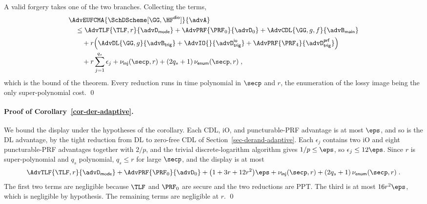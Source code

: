  A valid forgery takes one of the two branches. Collecting the terms,
$$
\begin{aligned}
&\AdvEUFCMA{\SchDScheme[\GG,\HF^{\mathsf{dio}}]}{\advA}\\
&\quad\le
\AdvTLF{\TLF,r}{\advD_{\mathsf{mode}}}
+\AdvPRF{\PRF_0}{\advD_0}
+\AdvCDL{\GG,g,f}{\advB_{\mathsf{main}}}\\
&\qquad+r\Big(
\AdvDL{\GG,g}{\advB_{\mathsf{trig}}}
+\AdvIO{}{\advD^{\mathsf{io}}_{\mathsf{trig}}}
+\AdvPRF{\PRF_4}{\advD^{\mathsf{prf}}_{\mathsf{trig}}}
\Big)\\
&\qquad+r\sum_{j=1}^{q_s}\epsilon_j
+\nu_{\mathsf{inj}}(\secp,r)
+(2q_s+1)\,\nu_{\mathsf{enum}}(\secp,r) \;,
\end{aligned}
$$
which is the bound of the theorem. Every reduction runs in time polynomial in $\secp$ and $r$, the enumeration of the lossy image being the only super-polynomial cost. \qed

\paragraph*{Proof of Corollary~\ref{cor-der-adaptive}.} We bound the display under the hypotheses of the corollary. Each CDL, iO, and puncturable-PRF advantage is at most $\eps$, and so is the DL advantage, by the tight reduction from DL to zero-free CDL of Section~\ref{sec-derand-adaptive}. Each $\epsilon_j$ contains two iO and eight puncturable-PRF advantages together with $2/p$, and the trivial discrete-logarithm algorithm gives $1/p \le \eps$, so $\epsilon_j \le 12\eps$. Since $r$ is super-polynomial and $q_s$ polynomial, $q_s \le r$ for large $\secp$, and the display is at most
$$
\AdvTLF{\TLF,r}{\advD_{\mathsf{mode}}}
+\AdvPRF{\PRF_0}{\advD_0}
+\big(1 + 3r + 12r^2\big)\eps
+\nu_{\mathsf{inj}}(\secp,r)
+(2q_s+1)\,\nu_{\mathsf{enum}}(\secp,r) \;.
$$
The first two terms are negligible because $\TLF$ and $\PRF_0$ are secure and the two reductions are PPT. The third is at most $16 r^2 \eps$, which is negligible by hypothesis. The remaining terms are negligible at $r$. \qed
